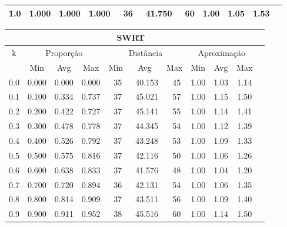 \begin{table}[!tbh]
\begin{center}
{\begin{tabular}{|c|c|c|c|c|c|c|c|c|c|c|}
1.0                & 1.000     & 1.000    & 1.000    & ~36      & ~41.750  & ~60     & 1.00    & 1.05   & 1.53            \\ \hline
\end{tabular}%
\vspace{5pt}
\begin{tabular}{|c|c|c|c|c|c|c|c|c|c|c|}
\hline
\multicolumn{10}{|c|}{\bf SWRT}                                                                                           \\ \hline
\multirow{2}{*}{k} & \multicolumn{3}{c|}{Proporção}  & \multicolumn{3}{c|}{Distância} & \multicolumn{3}{c|}{Aproximação}  \\ \cline{2-10}
                   & Min       & Avg      & Max      & Min      & Avg      & Max     & Min     & Avg    & Max             \\ \hline
0.0                & 0.000     & 0.000    & 0.000    & ~35      & ~40.153  & ~45     & 1.00    & 1.03   & 1.14            \\ \hline
0.1                & 0.100     & 0.334    & 0.737    & ~37      & ~45.021  & ~57     & 1.00    & 1.15   & 1.50            \\ \hline
0.2                & 0.200     & 0.422    & 0.727    & ~37      & ~45.141  & ~55     & 1.00    & 1.14   & 1.41            \\ \hline
0.3                & 0.300     & 0.478    & 0.778    & ~37      & ~44.345  & ~54     & 1.00    & 1.12   & 1.39            \\ \hline
0.4                & 0.400     & 0.526    & 0.792    & ~37      & ~43.248  & ~53     & 1.00    & 1.09   & 1.33            \\ \hline
0.5                & 0.500     & 0.575    & 0.816    & ~37      & ~42.116  & ~50     & 1.00    & 1.06   & 1.26            \\ \hline
0.6                & 0.600     & 0.638    & 0.833    & ~37      & ~41.576  & ~48     & 1.00    & 1.04   & 1.20            \\ \hline
0.7                & 0.700     & 0.720    & 0.894    & ~36      & ~42.131  & ~54     & 1.00    & 1.06   & 1.35            \\ \hline
0.8                & 0.800     & 0.814    & 0.909    & ~37      & ~43.511  & ~56     & 1.00    & 1.09   & 1.40            \\ \hline
0.9                & 0.900     & 0.911    & 0.952    & ~38      & ~45.516  & ~60     & 1.00    & 1.14   & 1.50            \\ \hline

\end{tabular}}
\end{center}
\end{table}
